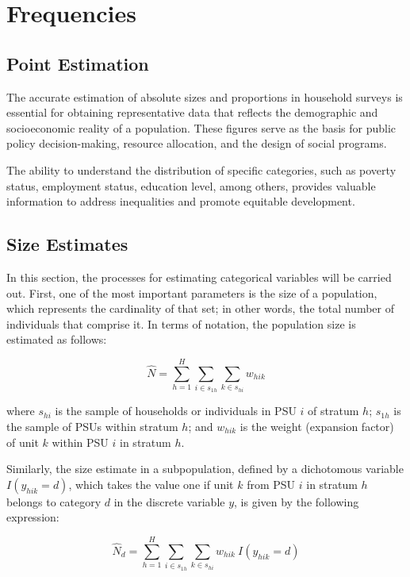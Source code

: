 \documentclass[
  12pt,
]{book}
\begin{document}
\section{Frequencies}\label{frequencies}

\subsection{Point Estimation}\label{point-estimation}

The accurate estimation of absolute sizes and proportions in household surveys is essential for obtaining representative data that reflects the demographic and socioeconomic reality of a population. These figures serve as the basis for public policy decision-making, resource allocation, and the design of social programs.

The ability to understand the distribution of specific categories, such as poverty status, employment status, education level, among others, provides valuable information to address inequalities and promote equitable development.

\subsection{Size Estimates}\label{size-estimates}

In this section, the processes for estimating categorical variables will be carried out. First, one of the most important parameters is the size of a population, which represents the cardinality of that set; in other words, the total number of individuals that comprise it. In terms of notation, the population size is estimated as follows:

\[
\widehat{N} = \sum_{h=1}^{H} \sum_{i \in s_{1h}} \sum_{k \in s_{hi}} w_{hik}
\]

where \(s_{hi}\) is the sample of households or individuals in PSU \(i\) of stratum \(h\); \(s_{1h}\) is the sample of PSUs within stratum \(h\); and \(w_{hik}\) is the weight (expansion factor) of unit \(k\) within PSU \(i\) in stratum \(h\).

Similarly, the size estimate in a subpopulation, defined by a dichotomous variable \(I(y_{hik} = d)\), which takes the value one if unit \(k\) from PSU \(i\) in stratum \(h\) belongs to category \(d\) in the discrete variable \(y\), is given by the following expression:

\[
{\widehat{N}}_d = \sum_{h=1}^{H}\sum_{i \in s_{1h}} \sum_{ k \in s_{hi}} w_{hik} \ I(y_{hik} = d)
\]
\end{document}
